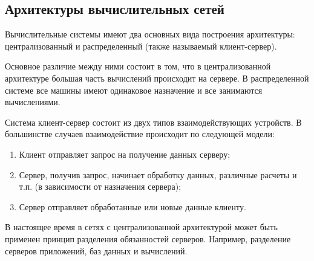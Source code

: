 \subsection{Архитектуры вычислительных сетей}

Вычислительные системы имеют два основных вида построения архитектуры: централизованный
и распределенный (также называемый клиент-сервер).

Основное различие между ними состоит в том, что в централизованной архитектуре большая
часть вычислений происходит на сервере. В распределенной системе все машины имеют
одинаковое назначение и все занимаются вычислениями.

Система клиент-сервер состоит из двух типов взаимодействующих устройств.
В большинстве случаев взаимодействие происходит по следующей модели:

\begin{enumerate}
    \item Клиент отправляет запрос на получение данных серверу;
    \item Сервер, получив запрос, начинает обработку данных, различные расчеты и т.п.
        (в зависимости от назначения сервера);
    \item Сервер отправляет обработанные или новые данные клиенту.
\end{enumerate}

В настоящее время в сетях с централизованной архитектурой может быть применен принцип
разделения обязанностей серверов. Например, разделение серверов приложений, баз данных и
вычислений.
